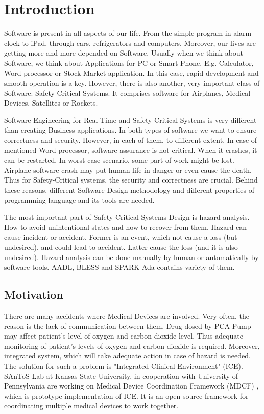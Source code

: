 
\cleardoublepage


\chapter{Introduction}
\label{introduction}

Software is present in all aspects of our life. From the simple program in alarm clock to iPad, through cars, refrigerators and computers. Moreover, our lives are getting more and more depended on Software. Usually when we think about Software, we think about Applications for PC or Smart Phone. E.g. Calculator, Word processor or Stock Market application. In this case, rapid development and smooth operation is a key. However, there is also another, very important class of Software: Safety Critical Systems. It comprises software for Airplanes, Medical Devices, Satellites or Rockets.

Software Engineering for Real-Time and Safety-Critical Systems is very different than creating Business applications. In both types of software we want to ensure correctness and security. However, in each of them, to different extent. In case of mentioned Word processor, software assurance is not critical. When it crashes, it can be restarted. In worst case scenario, some part of work might be lost. Airplane software crash may put human life in danger or even cause the death. Thus for Safety-Critical systems, the security and correctness are crucial. Behind these reasons, different Software Design methodology and different properties of programming language and its tools are needed.

The most important part of Safety-Critical Systems Design is hazard analysis. How to avoid unintentional states and how to recover from them. Hazard can cause incident or accident. Former is an event, which not cause a loss (but undesired), and could lead to accident. Latter cause the loss (and it is also undesired). Hazard analysis can be done manually by human or automatically by software tools. AADL, BLESS and SPARK Ada contains variety of them.


\section{Motivation}
\label{introduction:motivation}
There are many accidents where Medical Devices are involved. Very often, the reason is the lack of communication between them. Drug dosed by PCA Pump may affect patient's level of oxygen and carbon dioxide level. Thus adequate monitoring of patient's levels of oxygen and carbon dioxide is required. Moreover, integrated system, which will take adequate action in case of hazard is needed. The solution for such a problem is "Integrated Clinical Environment" (ICE). SAnToS Lab at Kansas State University, in cooperation with University of Pennsylvania are working on Medical Device Coordination Framework (MDCF) \cite{MedicalApplicationPlatforms:Paper}, which is prototype implementation of ICE. It is an open source framework for coordinating multiple medical devices to work together.

